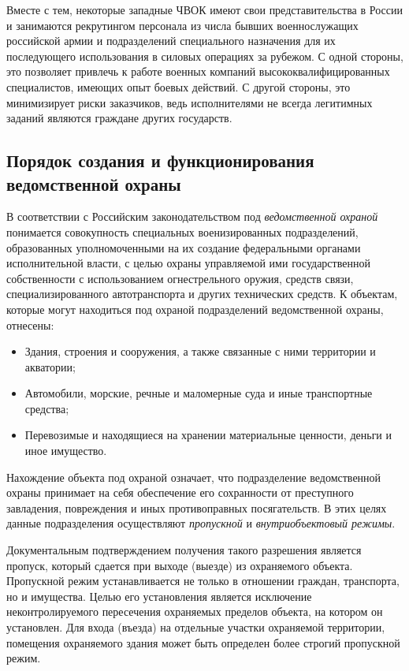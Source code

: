 \documentclass[a4paper,12pt,fleqn]{article} %
\begin{document}
Вместе с тем, некоторые западные ЧВОК имеют свои представительства в России и занимаются рекрутингом персонала из числа бывших военнослужащих российской армии и подразделений специального назначения для их последующего использования в силовых операциях за рубежом. С одной стороны, это позволяет привлечь к работе военных компаний высококвалифицированных специалистов, имеющих опыт боевых действий. С другой стороны, это минимизирует риски заказчиков, ведь исполнителями не всегда легитимных заданий являются граждане других государств.

\subsection{Порядок создания и функционирования ведомственной охраны}

В соответствии с Российским законодательством под \textit{ведомственной охраной} понимается совокупность специальных военизированных подразделений, образованных уполномоченными на их создание федеральными органами исполнительной власти, с целью охраны управляемой ими государственной собственности с использованием огнестрельного оружия, средств связи, специализированного автотранспорта и других технических средств. К объектам, которые могут находиться под охраной подразделений ведомственной охраны, отнесены:

\begin{itemize}
	\item Здания, строения и сооружения, а также связанные с ними территории и акватории;
	\item Автомобили, морские, речные и маломерные суда и иные транспортные средства;
	\item Перевозимые и находящиеся на хранении материальные ценности, деньги и иное имущество.
\end{itemize}

Нахождение объекта под охраной означает, что подразделение ведомственной охраны принимает на себя обеспечение его сохранности от преступного завладения, повреждения и иных противоправных посягательств. В этих целях данные подразделения осуществляют \textit{пропускной} и \textit{внутриобъектовый режимы}.\\


Документальным подтверждением получения такого разрешения является пропуск, который сдается при выходе (выезде) из охраняемого объекта. Пропускной режим устанавливается не только в отношении граждан, транспорта, но и имущества. Целью его установления является исключение неконтролируемого пересечения охраняемых пределов объекта, на котором он установлен. Для входа (въезда) на отдельные участки охраняемой территории, помещения охраняемого здания может быть определен более строгий пропускной режим. \\
\end{document}
